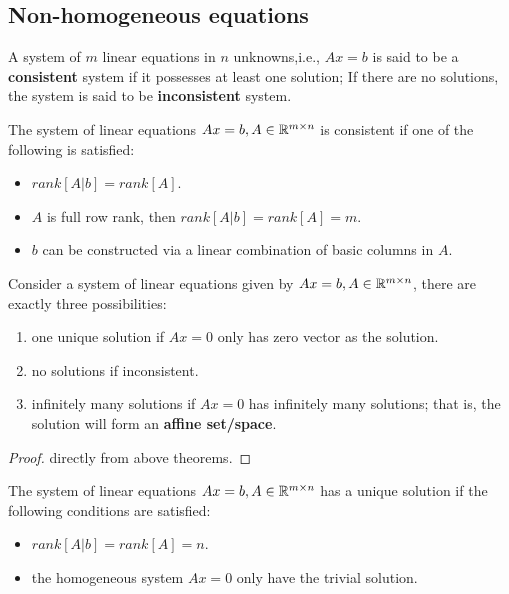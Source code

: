 \begin{refsection}
\subsection{Non-homogeneous equations}
\begin{definition}[consistence]
A system of $m$ linear equations in $n$ unknowns,i.e., $Ax=b$ is said to be a \textbf{consistent} system if it possesses at least one solution; If there are no solutions, the system is said to be \textbf{inconsistent} system. 
\end{definition}

\begin{lemma} The system of linear equations $Ax=b,A\in \mathbb{R}^{m\times n}$ is consistent if one of the following is satisfied:
\begin{itemize}
    \item $rank[A|b]=rank[A]$. 
    \item $A$ is full row rank, then $rank[A|b] = rank[A] = m$.
    \item $b$ can be constructed via a linear combination of basic columns in $A$.
\end{itemize}
\end{lemma}




\begin{theorem}
Consider a system of linear equations given by $Ax=b,A\in \mathbb{R}^{m\times n}$, there are exactly three possibilities:\cite{meyer2000matrix}
\begin{enumerate}
    \item one unique solution if $Ax=0$ only has zero vector as the solution.
    \item no solutions if inconsistent.
    \item infinitely many solutions if $Ax = 0$ has infinitely many solutions; that is, the solution will form an \textbf{affine set/space}.
\end{enumerate}
\end{theorem}
\begin{proof}
directly from above theorems.
\end{proof}



\begin{corollary}
The system of linear equations $Ax=b,A\in \mathbb{R}^{m\times n}$ has a unique solution if  the following conditions are satisfied:
\begin{itemize}
    \item $rank[A|b]=rank[A] = n$. 
    \item the homogeneous system $Ax=0$ only have the trivial solution.
\end{itemize}
\end{corollary}


\end{refsection}
